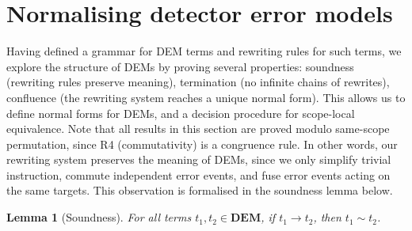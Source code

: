 \documentclass[11pt,a4paper]{article}
\newtheorem{lemma}[theorem]{Lemma}
\newcommand{\tostep}{\to}
\begin{document}
\section{Normalising detector error models}
\label{sec:results}

Having defined a grammar for DEM terms and rewriting rules for such terms, we explore the structure of DEMs by proving several properties: 
soundness (rewriting rules preserve meaning), termination (no infinite chains of rewrites), confluence (the rewriting system reaches a unique normal form).
This allows us to define normal forms for DEMs, and a decision procedure for scope-local equivalence. Note that all results in this section are proved modulo same-scope permutation, since R4 (commutativity) is a congruence rule. In other words, our rewriting system preserves the meaning of DEMs, since we only simplify trivial instruction, commute independent error events, and fuse error events acting on the same targets. This observation is formalised in the soundness lemma below.

\begin{lemma}[Soundness]
\label{lem:soundness}
For all terms $t_1, t_2 \in \mathbf{DEM}$, if $t_1 \tostep t_2$, then $t_1 \sim t_2$.
\end{lemma}
\end{document}
